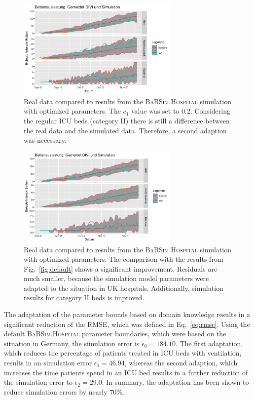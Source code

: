 \documentclass[conference]{IEEEtran}
\newcommand{\babsimhospital}{\textsc{BaBSim.Hospital}\xspace}
\begin{document}
\begin{figure}
    \centering
    \includegraphics[width=0.7\textwidth]{optimzed01b.png}
    \caption{Real data compared to results from the \babsimhospital simulation with optimized parameters. The  $c_1$ value was set to $0.2$. Considering the regular \gls{ICU} beds (category II) there is still a difference between the real data and the simulated data. Therefore, a second adaption was necessary.
  }
\label{fig:optimized01b}
\end{figure}
\begin{figure}
    \centering
    \includegraphics[width=0.7\textwidth]{optimized02.png}
    \caption{Real data compared to results from the \babsimhospital simulation with optimized parameters. The comparison with the results from Fig.~\ref{fig:default} shows a significant improvement. Residuals are much smaller,
    because the simulation model parameters were adapted to the situation in UK hospitals. Additionally, simulation results for category II beds is improved.  
  }
\label{fig:optimized02}
\end{figure}

The adaptation of the parameter bounds based on domain knowledge results in a significant reduction of the \gls{RMSE}, which was defined in  Eq.~\ref{eq:rmse}. 
Using the default \babsimhospital parameter boundaries, which were based on the situation in Germany, the simulation error is $\epsilon_0 = 184.10$.
The first adaptation, which reduces the percentage of patients treated in \gls{ICU} beds with ventilation, results in an simulation error $\epsilon_1 =  46.94$, whereas the second adaption, which increases the time patients spend in an \gls{ICU} bed results in a further reduction of the simulation error to $\epsilon_2 = 29.0$. In summary, the adaptation has been shown to reduce simulation errors by nearly 70\%.
\end{document}
